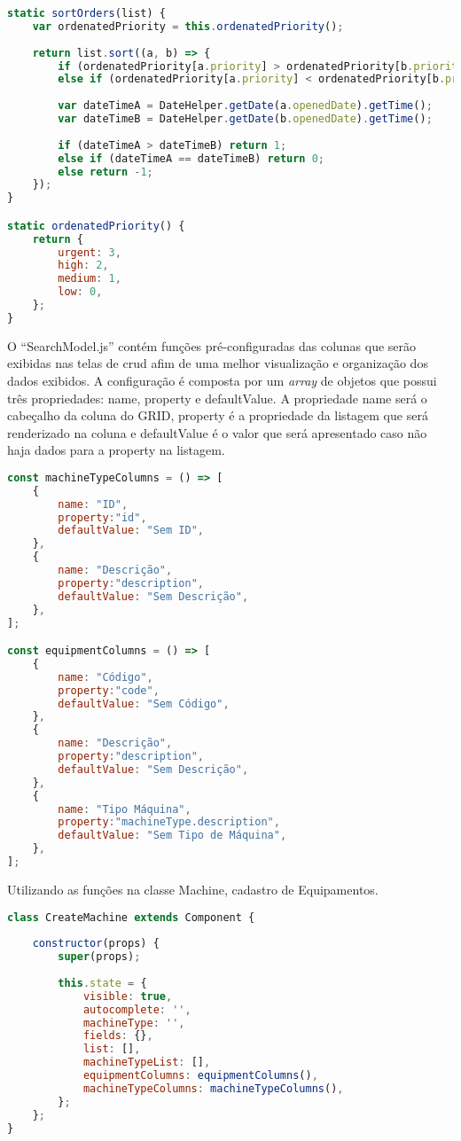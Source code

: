 \begin{lstlisting}[language=JavaScript, caption={Funções responsáveis pela ordenação}]
static sortOrders(list) {
	var ordenatedPriority = this.ordenatedPriority();
	
	return list.sort((a, b) => {
		if (ordenatedPriority[a.priority] > ordenatedPriority[b.priority]) return -1;
		else if (ordenatedPriority[a.priority] < ordenatedPriority[b.priority]) return 1;
		
		var dateTimeA = DateHelper.getDate(a.openedDate).getTime();
		var dateTimeB = DateHelper.getDate(b.openedDate).getTime();
		
		if (dateTimeA > dateTimeB) return 1;
		else if (dateTimeA == dateTimeB) return 0;
		else return -1;
	});
}

static ordenatedPriority() {
	return {
		urgent: 3,
		high: 2,
		medium: 1,
		low: 0,
	};
}
\end{lstlisting}

O ``SearchModel.js'' contém funções pré-configuradas das colunas que serão exibidas nas telas de crud afim de uma melhor visualização e organização dos dados exibidos.
A configuração é composta por um \textit{array} de objetos que possui três propriedades: name, property e defaultValue.
A propriedade name será o cabeçalho da coluna do GRID, property é a propriedade da listagem que será renderizado na coluna e defaultValue é o valor que será apresentado caso não haja dados para a property na listagem.

\begin{lstlisting}[language=JavaScript, caption={Definição da configuração para consulta de dados}]
const machineTypeColumns = () => [
	{
		name: "ID",
		property:"id",
		defaultValue: "Sem ID",
	},
	{
		name: "Descrição",
		property:"description",
		defaultValue: "Sem Descrição",
	},
];

const equipmentColumns = () => [
	{
		name: "Código",
		property:"code",
		defaultValue: "Sem Código",
	},
	{
		name: "Descrição",
		property:"description",
		defaultValue: "Sem Descrição",
	},
	{
		name: "Tipo Máquina",
		property:"machineType.description",
		defaultValue: "Sem Tipo de Máquina",
	},
];
\end{lstlisting}

Utilizando as funções na classe Machine, cadastro de Equipamentos.

\begin{lstlisting}[language=JavaScript, caption={Tela para cadastro de equipamento}]
class CreateMachine extends Component {
	
	constructor(props) {
		super(props);
		
		this.state = {
			visible: true,
			autocomplete: '',
			machineType: '',
			fields: {},
			list: [],
			machineTypeList: [],
			equipmentColumns: equipmentColumns(),
			machineTypeColumns: machineTypeColumns(),
		};
	};
}
\end{lstlisting}

